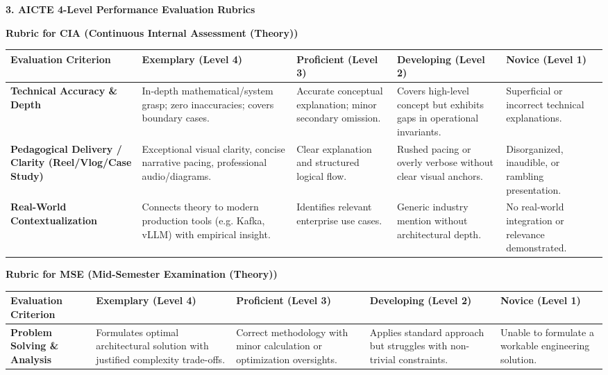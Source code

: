 \documentclass[10pt,a4paper]{article}
\begin{document}
\vspace{6pt}
{\large\textbf{\color{nbaNavy}3. AICTE 4-Level Performance Evaluation Rubrics}}

\vspace{4pt}
{\normalsize\textbf{\color{nbaNavy}Rubric for CIA (Continuous Internal Assessment (Theory))}}
\begin{table}[h!]
\centering
\footnotesize
\begin{tabularx}{\textwidth}{L{2.8cm} Y Y Y Y}
\toprule
{}
\textbf{Evaluation Criterion} & \textbf{Exemplary (Level 4)} & \textbf{Proficient (Level 3)} & \textbf{Developing (Level 2)} & \textbf{Novice (Level 1)} \\
\midrule
\textbf{Technical Accuracy \& Depth} & In-depth mathematical/system grasp; zero inaccuracies; covers boundary cases. & Accurate conceptual explanation; minor secondary omission. & Covers high-level concept but exhibits gaps in operational invariants. & Superficial or incorrect technical explanations. \\
 \hline \textbf{Pedagogical Delivery / Clarity (Reel/Vlog/Case Study)} & Exceptional visual clarity, concise narrative pacing, professional audio/diagrams. & Clear explanation and structured logical flow. & Rushed pacing or overly verbose without clear visual anchors. & Disorganized, inaudible, or rambling presentation. \\
 \hline \textbf{Real-World Contextualization} & Connects theory to modern production tools (e.g. Kafka, vLLM) with empirical insight. & Identifies relevant enterprise use cases. & Generic industry mention without architectural depth. & No real-world integration or relevance demonstrated. \\
\bottomrule
\end{tabularx}
\end{table}
\vspace{4pt}
{\normalsize\textbf{\color{nbaNavy}Rubric for MSE (Mid-Semester Examination (Theory))}}
\begin{table}[h!]
\centering
\footnotesize
\begin{tabularx}{\textwidth}{L{2.8cm} Y Y Y Y}
\toprule
{}
\textbf{Evaluation Criterion} & \textbf{Exemplary (Level 4)} & \textbf{Proficient (Level 3)} & \textbf{Developing (Level 2)} & \textbf{Novice (Level 1)} \\
\midrule
\textbf{Problem Solving \& Analysis} & Formulates optimal architectural solution with justified complexity trade-offs. & Correct methodology with minor calculation or optimization oversights. & Applies standard approach but struggles with non-trivial constraints. & Unable to formulate a workable engineering solution. \\
\bottomrule
\end{tabularx}
\end{table}
\end{document}
